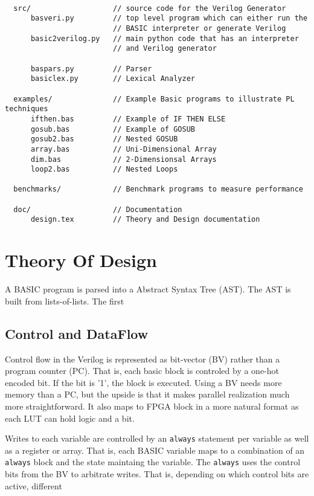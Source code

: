 \documentclass[10pt]{article}
\begin{document}
\begin{verbatim} 

  src/                   // source code for the Verilog Generator
      basveri.py         // top level program which can either run the 
                         // BASIC interpreter or generate Verilog
      basic2verilog.py   // main python code that has an interpreter 
                         // and Verilog generator

      baspars.py         // Parser 
      basiclex.py        // Lexical Analyzer                  

  examples/              // Example Basic programs to illustrate PL techniques 
      ifthen.bas         // Example of IF THEN ELSE
      gosub.bas          // Example of GOSUB 
      gosub2.bas         // Nested GOSUB
      array.bas          // Uni-Dimensional Array
      dim.bas            // 2-Dimensionsal Arrays 
      loop2.bas          // Nested Loops 

  benchmarks/            // Benchmark programs to measure performance
    
  doc/                   // Documentation 
      design.tex         // Theory and Design documentation

\end{verbatim}

\section{Theory Of Design}

A BASIC program is parsed into a Abstract Syntax Tree (AST). The AST
is built from lists-of-lists. The first 

\subsection{Control and DataFlow}

Control flow in the Verilog is represented as bit-vector (BV) rather than
a program counter (PC). That is, each basic block is controled by a
one-hot encoded bit. If the bit is '1', the block is executed.
Using a BV needs more memory than a PC, but the upside is that
it makes parallel realization much more straightforward. It also maps
to FPGA block in a more natural format as each LUT can hold logic
and a bit. 

Writes to each variable are controlled by an {\tt always} statement
per variable as well as a register or array.
That is, each BASIC variable  maps to a combination of an
{\tt always} block and the state maintaing the variable. The
{\tt always} uses the control bits from the BV to arbitrate writes.
That is, depending on which control bits are active, different
\end{document}
